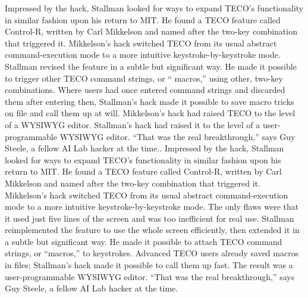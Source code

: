 \ifdefined\eng
\ifdefined\vone
Impressed by the hack, Stallman looked for ways to expand TECO's functionality in similar fashion upon his return to MIT. He found a TECO feature called Control-R, written by Carl Mikkelson and named after the two-key combination that triggered it. Mikkelson's hack switched TECO from its usual abstract command-execution mode to a more intuitive keystroke-by-keystroke mode. Stallman revised the feature in a subtle but significant way. He made it possible to trigger other TECO command strings, or `` macros,'' using other, two-key combinations. Where users had once entered command strings and discarded them after entering then, Stallman's hack made it possible to save macro tricks on file and call them up at will. Mikkelson's hack had raised TECO to the level of a WYSIWYG editor. Stallman's hack had raised it to the level of a user-programmable WYSIWYG editor. ``That was the real breakthrough,'' says Guy Steele, a fellow AI Lab hacker at the time..
\fi
\ifdefined\vtwo
Impressed by the hack, Stallman looked for ways to expand TECO's functionality in similar fashion upon his return to MIT. He found a TECO feature called Control-R, written by Carl Mikkelson and named after the two-key combination that triggered it. Mikkelson's hack switched TECO from its usual abstract command-execution mode to a more intuitive keystroke-by-keystroke mode. The only flaws were that it used just five lines of the screen and was too inefficient for real use. Stallman reimplemented the feature to use the whole screen efficiently, then extended it in a subtle but significant way. He made it possible to attach TECO command strings, or ``macros,'' to keystrokes. Advanced TECO users already saved macros in files; Stallman's hack made it possible to call them up fast. The result was a user-programmable WYSIWYG editor. ``That was the real breakthrough,'' says Guy Steele, a fellow AI Lab hacker at the time.
\fi
\fi

